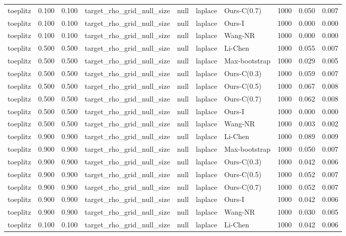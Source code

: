 \begin{tabular}{lrrllllrrr}
toeplitz & 0.100 & 0.100 & target\_rho\_grid\_null\_size & null & laplace & Ours-C(0.7) & 1000 & 0.050 & 0.007 \\
toeplitz & 0.100 & 0.100 & target\_rho\_grid\_null\_size & null & laplace & Ours-I & 1000 & 0.000 & 0.000 \\
toeplitz & 0.100 & 0.100 & target\_rho\_grid\_null\_size & null & laplace & Wang-NR & 1000 & 0.000 & 0.000 \\
toeplitz & 0.500 & 0.500 & target\_rho\_grid\_null\_size & null & laplace & Li-Chen & 1000 & 0.055 & 0.007 \\
toeplitz & 0.500 & 0.500 & target\_rho\_grid\_null\_size & null & laplace & Max-bootstrap & 1000 & 0.029 & 0.005 \\
toeplitz & 0.500 & 0.500 & target\_rho\_grid\_null\_size & null & laplace & Ours-C(0.3) & 1000 & 0.059 & 0.007 \\
toeplitz & 0.500 & 0.500 & target\_rho\_grid\_null\_size & null & laplace & Ours-C(0.5) & 1000 & 0.067 & 0.008 \\
toeplitz & 0.500 & 0.500 & target\_rho\_grid\_null\_size & null & laplace & Ours-C(0.7) & 1000 & 0.062 & 0.008 \\
toeplitz & 0.500 & 0.500 & target\_rho\_grid\_null\_size & null & laplace & Ours-I & 1000 & 0.000 & 0.000 \\
toeplitz & 0.500 & 0.500 & target\_rho\_grid\_null\_size & null & laplace & Wang-NR & 1000 & 0.003 & 0.002 \\
toeplitz & 0.900 & 0.900 & target\_rho\_grid\_null\_size & null & laplace & Li-Chen & 1000 & 0.089 & 0.009 \\
toeplitz & 0.900 & 0.900 & target\_rho\_grid\_null\_size & null & laplace & Max-bootstrap & 1000 & 0.050 & 0.007 \\
toeplitz & 0.900 & 0.900 & target\_rho\_grid\_null\_size & null & laplace & Ours-C(0.3) & 1000 & 0.042 & 0.006 \\
toeplitz & 0.900 & 0.900 & target\_rho\_grid\_null\_size & null & laplace & Ours-C(0.5) & 1000 & 0.052 & 0.007 \\
toeplitz & 0.900 & 0.900 & target\_rho\_grid\_null\_size & null & laplace & Ours-C(0.7) & 1000 & 0.052 & 0.007 \\
toeplitz & 0.900 & 0.900 & target\_rho\_grid\_null\_size & null & laplace & Ours-I & 1000 & 0.042 & 0.006 \\
toeplitz & 0.900 & 0.900 & target\_rho\_grid\_null\_size & null & laplace & Wang-NR & 1000 & 0.030 & 0.005 \\
toeplitz & 0.100 & 0.100 & target\_rho\_grid\_null\_size & null & laplace & Li-Chen & 1000 & 0.042 & 0.006 \\

\end{tabular}
